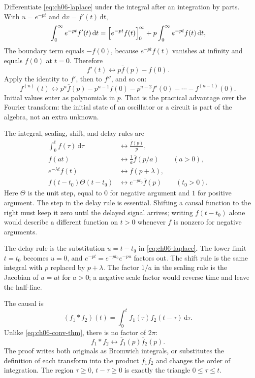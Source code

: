 Differentiate \eqref{eq:ch06-laplace} under the integral after an integration by parts. With $u=e^{-pt}$ and $\mathrm{d}v=f'(t)\,\mathrm{d}t$,
\begin{equation}
\int_0^{\infty}e^{-pt}f'(t)\,\mathrm{d}t
=\Bigl[e^{-pt}f(t)\Bigr]_0^{\infty}
+p\int_0^{\infty}e^{-pt}f(t)\,\mathrm{d}t,
\end{equation}
The boundary term equals $-f(0)$, because $e^{-pt}f(t)$ vanishes at infinity and equals $f(0)$ at $t=0$. Therefore
\begin{equation}
f'(t)\longleftrightarrow p\bar f(p)-f(0).
\label{eq:ch06-laplace-derivative}
\end{equation}
Apply the identity to $f'$, then to $f''$, and so on:
\begin{equation}
f^{(n)}(t)\longleftrightarrow
p^n\bar f(p)-p^{n-1}f(0)-p^{n-2}f'(0)-\cdots-f^{(n-1)}(0).
\label{eq:ch06-laplace-nth}
\end{equation}
Initial values enter as polynomials in $p$. That is the practical advantage over the Fourier transform: the initial state of an oscillator or a circuit is part of the algebra, not an extra unknown.

The integral, scaling, shift, and delay rules are
\begin{align}
\int_0^{t}f(\tau)\,\mathrm{d}\tau
&\longleftrightarrow\frac{\bar f(p)}{p},\\
f(at)&\longleftrightarrow\frac{1}{a}\bar f(p/a)
\qquad(a>0),\\
e^{-\lambda t}f(t)&\longleftrightarrow\bar f(p+\lambda),\\
f(t-t_0)\Theta(t-t_0)&\longleftrightarrow e^{-pt_0}\bar f(p)
\qquad(t_0>0).
\end{align}
Here $\Theta$ is the unit step, equal to $0$ for negative argument and $1$ for positive argument. The step in the delay rule is essential. Shifting a causal function to the right must keep it zero until the delayed signal arrives; writing $f(t-t_0)$ alone would describe a different function on $t>0$ whenever $f$ is nonzero for negative arguments.

The delay rule is the substitution $u=t-t_0$ in \eqref{eq:ch06-laplace}. The lower limit $t=t_0$ becomes $u=0$, and $e^{-pt}=e^{-pt_0}e^{-pu}$ factors out. The shift rule is the same integral with $p$ replaced by $p+\lambda$. The factor $1/a$ in the scaling rule is the Jacobian of $u=at$ for $a>0$; a negative scale factor would reverse time and leave the half-line.

The causal  is
\begin{equation}
(f_1*f_2)(t)=\int_0^{t}f_1(\tau)f_2(t-\tau)\,\mathrm{d}\tau.
\label{eq:ch06-laplace-conv}
\end{equation}
Unlike \eqref{eq:ch06-conv-thm}, there is no factor of $2\pi$:
\begin{equation}
f_1*f_2\longleftrightarrow\bar f_1(p)\bar f_2(p).
\label{eq:ch06-laplace-conv-thm}
\end{equation}
The proof writes both originals as Bromwich integrals, or substitutes the definition of each transform into the product $\bar f_1\bar f_2$ and changes the order of integration. The region $\tau\geq 0$, $t-\tau\geq 0$ is exactly the triangle $0\leq\tau\leq t$.

